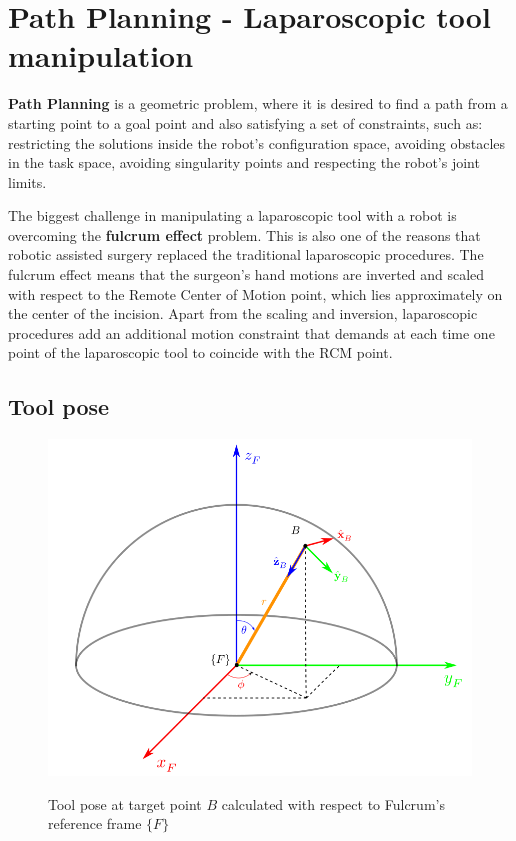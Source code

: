 \section{Path Planning - Laparoscopic tool manipulation}

\textbf{Path Planning} is a geometric problem, where it is desired to find a path from a starting point to a goal point and also satisfying a set of constraints, such as: 
restricting the solutions inside the robot's configuration space, avoiding obstacles in the task space, avoiding singularity points and respecting the robot's 
joint limits.

The biggest challenge in manipulating a laparoscopic tool with a robot is overcoming the \textbf{fulcrum effect} problem. This is also one of the reasons that 
robotic assisted surgery replaced the traditional laparoscopic procedures. The fulcrum effect means that the surgeon's hand motions are inverted and scaled 
with respect to the Remote Center of Motion point, which lies approximately on the center of the incision. Apart from the scaling and inversion, laparoscopic 
procedures add an additional motion constraint that demands at each time one point of the laparoscopic tool to coincide with the RCM point.

\subsection{Tool pose}

\begin{center}
\begin{figure}[H]
\centering
\includegraphics[width=12cm]{images/fulcrum-space.png}\\
\caption{Tool pose at target point $B$ calculated with respect to Fulcrum's reference frame $\lbrace F \rbrace$}
\end{figure}
\end{center}


